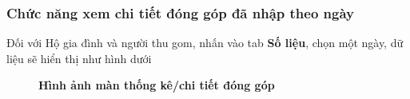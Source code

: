 \subsubsection{Chức năng xem chi tiết đóng góp đã nhập theo ngày}
Đối với Hộ gia đình và người thu gom, nhấn vào tab \textbf{Số liệu}, chọn một ngày, dữ liệu sẽ hiển thị như hình dưới
\begin{figure}[H]
  \centering
  \hfill
  \caption[Hình ảnh màn thống kê/chi tiết đóng góp]{\bfseries \fontsize{12pt}{0pt}
  \selectfont Hình ảnh màn thống kê/chi tiết đóng góp}
  \label{contribution_detail_waznet}
\end{figure}

